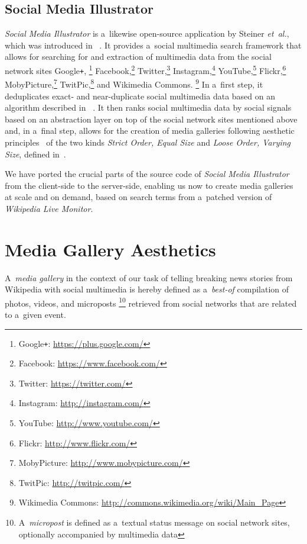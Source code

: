 \documentclass{sig-alternate}
\newcommand{\inlinelistingsize}{\fontsize{8pt}{11pt}}
\let\oldurl\url
\renewcommand{\url}[1]{\inlinelistingsize\oldurl{#1}}
\begin{document}
\subsection{Social Media Illustrator}

\emph{Social Media Illustrator} is a~likewise
open-source application by Steiner \emph{et~al.},
which was introduced in%
~\cite{steiner2013meteoroid,steiner2013tocrop}.
It provides a~social multimedia search framework
that allows for searching for and extraction of
multimedia data from the social network sites
Google\texttt{+},%
\footnote{Google\texttt{+}: \url{https://plus.google.com/}}
Facebook,\footnote{Facebook: \url{https://www.facebook.com/}}
Twitter,\footnote{Twitter: \url{https://twitter.com/}}
Instagram,\footnote{Instagram: \url{http://instagram.com/}}
YouTube,\footnote{YouTube: \url{http://www.youtube.com/}}
Flickr,\footnote{Flickr: \url{http://www.flickr.com/}}
MobyPicture,\footnote{MobyPicture: \url{http://www.mobypicture.com/}}
TwitPic,\footnote{TwitPic: \url{http://twitpic.com/}}
and Wikimedia Commons.%
\footnote{Wikimedia Commons: \url{http://commons.wikimedia.org/wiki/Main_Page}}
In a~first step, it deduplicates exact- and near-duplicate
social multimedia data based on an algorithm described in%
~\cite{steiner2013clustering}.
It then ranks social multimedia data by social signals%
~\cite{steiner2013meteoroid} based on an abstraction layer
on top of the social network sites mentioned above
and, in a~final step, allows for the creation of media galleries
following aesthetic principles~\cite{steiner2012aesthetic}
of the two kinds \emph{Strict Order, Equal Size}
and \emph{Loose Order, Varying Size},
defined in~\cite{steiner2013tocrop}.

We have ported the crucial parts
of the source code of \emph{Social Media Illustrator}
from the client-side to the server-side,
enabling us now to create media galleries at scale and on demand,
based on search terms from a~patched version of \emph{Wikipedia Live Monitor}.

\section{Media Gallery Aesthetics}
\label{sec:media-gallery-aesthetics}
\selectfont

A~\emph{media gallery} in the context of our task of
telling breaking news stories from Wikipedia with social multimedia
is hereby defined as a~\emph{best-of} compilation of photos, videos,
and microposts%
\footnote{A~\emph{micropost} is defined as a~textual status message
on social network sites, optionally accompanied by multimedia data}
retrieved from social networks that are related to a~given event.
\end{document}
